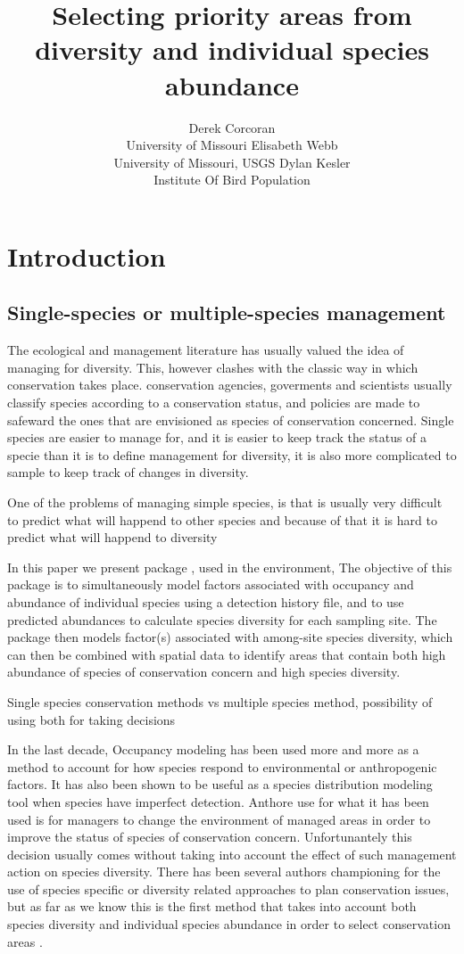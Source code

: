 \documentclass[article]{jss}
\author{
Derek Corcoran\\University of Missouri \And Elisabeth Webb\\University of Missouri, USGS \And Dylan Kesler\\Institute Of Bird Population
}
\title{Selecting priority areas from diversity and individual species abundance
\pkg{DiversityOccupancy}}
\begin{document}
\section{Introduction}\label{introduction}

\subsection{Single-species or multiple-species
management}\label{single-species-or-multiple-species-management}

The ecological and management literature has usually valued the idea of
managing for diversity. This, however clashes with the classic way in
which conservation takes place. conservation agencies, goverments and
scientists usually classify species according to a conservation status,
and policies are made to safeward the ones that are envisioned as
species of conservation concerned. Single species are easier to manage
for, and it is easier to keep track the status of a specie than it is to
define management for diversity, it is also more complicated to sample
to keep track of changes in diversity.

One of the problems of managing simple species, is that is usually very
difficult to predict what will happend to other species and because of
that it is hard to predict what will happend to diversity
\citep{pulliam2000relationship}

In this paper we present package , used in the
 environment, The objective of this package is to
simultaneously model factors associated with occupancy and abundance of
individual species using a detection history file, and to use predicted
abundances to calculate species diversity for each sampling site. The
package then models factor(s) associated with among-site species
diversity, which can then be combined with spatial data to identify
areas that contain both high abundance of species of conservation
concern and high species diversity.

Single species conservation methods vs multiple species method,
possibility of using both for taking decisions

In the last decade, Occupancy modeling has been used more and more as a
method to account for how species respond to environmental or
anthropogenic factors. It has also been shown to be useful as a species
distribution modeling tool when species have imperfect detection.
Anthore use for what it has been used is for managers to change the
environment of managed areas in order to improve the status of species
of conservation concern. Unfortunantely this decision usually comes
without taking into account the effect of such management action on
species diversity. There has been several authors championing for the
use of species specific or diversity related approaches to plan
conservation issues, \citep{hill_beaver_1982, mackenzie_estimating_2002}
but as far as we know this is the first method that takes into account
both species diversity and individual species abundance in order to
select conservation areas \citep{mackenzie_estimating_2002}.
\end{document}
